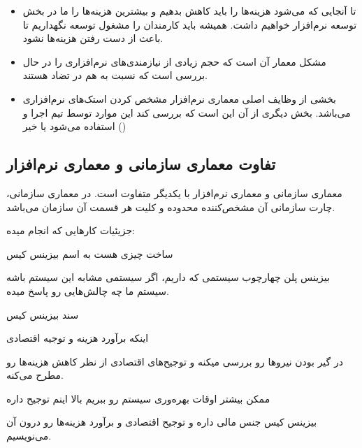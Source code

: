 \documentclass[a4paper]{article}
\begin{document}
\begin{itemize}
    \item تا آنجایی که می‌شود هزینه‌ها را باید کاهش بدهیم و بیشترین هزینه‌ها را
    ما در بخش توسعه نرم‌افزار خواهیم داشت. همیشه باید کارمندان را مشغول توسعه
    نگهداریم تا باعث از دست رفتن هزینه‌ها نشود.
    \item مشکل معمار آن است که حجم زیادی از نیازمندی‌های نرم‌افزاری را در حال
    بررسی است که نسبت به هم در تضاد هستند.
    \item بخشی از وظایف اصلی معماری نرم‌افزار مشخص کردن استک‌های نرم‌افزاری
    می‌باشد. بخش دیگری از آن این است که بررسی کند این موارد توسط تیم اجرا و
    استفاده می‌شود یا خیر ()
\end{itemize}

\subsection{تفاوت معماری سازمانی و معماری نرم‌افزار}

معماری سازمانی و معماری نرم‌افزار با یکدیگر متفاوت است. در معماری سازمانی، چارت
سازمانی آن مشخص‌کننده محدوده و کلیت هر قسمت آن سازمان می‌باشد.





جزیئیات کار‌هایی که انجام میده:

ساخت چیزی هست به اسم بیزینس کیس

بیزینس پلن
چهارچوب سیستمی که داریم، اگر سیستمی مشابه این سیستم باشه سیستم ما چه چالش‌هایی
رو پاسخ میده.

سند بیزینس کیس

اینکه برآورد هزینه و توجیه اقتصادی

در گیر بودن نیرو‌ها رو بررسی میکنه و توجیح‌های اقتصادی از نظر کاهش هزینه‌ها رو
مطرح می‌کنه.

ممکن بیشتر اوقات بهره‌وری سیستم رو ببریم بالا اینم توجیح داره

بیزینس کیس جنس مالی داره و توجیح اقتصادی و برآورد هزینه‌ها رو درون آن می‌نویسیم.
\end{document}
